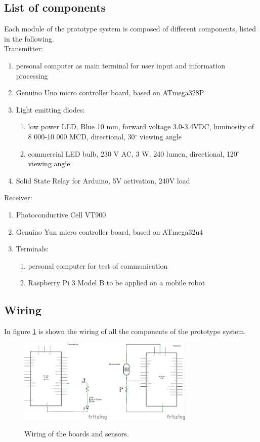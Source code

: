 \subsection{List of components}
\label{components}
Each module of the prototype system is composed of different components, listed in the following.\\
Transmitter:
\begin{enumerate}
\item personal computer as main terminal for user input and information processing
\item Genuino Uno micro controller board, based on ATmega328P \cite{genuinouno}
\item Light emitting diodes:
\begin{enumerate}
\item low power LED, Blue 10 mm, forward voltage 3.0-3.4VDC, luminosity of 8 000-10 000 MCD, directional, 30$^{\circ}$ viewing angle \cite{ledDS}
\item commercial LED bulb, 230 V AC, 3 W, 240 lumen, directional, 120$^{\circ}$ viewing angle 
\end{enumerate}
\item Solid State Relay for Arduino, 5V activation, 240V load
\end{enumerate}
Receiver:
\begin{enumerate}
\item Photoconductive Cell VT900
\item Genuino Yun micro controller board, based on ATmega32u4 \cite{arduinoyun}
\item Terminals:
\begin{enumerate}
\item personal computer for test of communication
\item Raspberry Pi 3 Model B to be applied on a mobile robot \cite{raspberrypi}
\end{enumerate}
\end{enumerate}

\subsection{Wiring}
In figure \ref{fig:wiringDC} is shown the wiring of all the components of the prototype system.

\begin{figure}[hbt]
\centering
  \includegraphics[height=150px]{img/transmitter_schem1}
  \includegraphics[height=150px]{img/receiver_schem1}
  \caption{Wiring of the boards and sensors.}
  \label{fig:wiringDC}
\end{figure}


